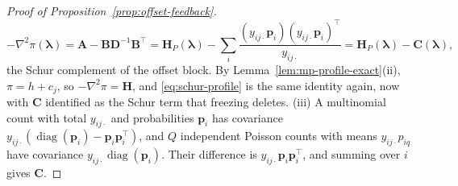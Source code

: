 \begin{proof}[Proof of Proposition~\ref{prop:offset-feedback}]
\begin{equation}
    -\nabla^{2}\pi(\bm{\lambda})=\mathbf{A}-\mathbf{B}\mathbf{D}^{-1}\mathbf{B}^{\top}=\mathbf{H}_{P}(\bm{\lambda})-\sum_{i}\frac{(y_{ij\cdot}\bm{p}_{i})(y_{ij\cdot}\bm{p}_{i})^{\top}}{y_{ij\cdot}}=\mathbf{H}_{P}(\bm{\lambda})-\mathbf{C}(\bm{\lambda}),
    \label{eq:schur-profile}
\end{equation}
the Schur complement of the offset block. By Lemma~\ref{lem:mp-profile-exact}(ii), $\pi=h+c_{j}$, so $-\nabla^{2}\pi=\mathbf{H}$, and \eqref{eq:schur-profile} is the same identity again, now with $\mathbf{C}$ identified as the Schur term that freezing deletes. (iii) A multinomial count with total $y_{ij\cdot}$ and probabilities $\bm{p}_{i}$ has covariance $y_{ij\cdot}(\operatorname{diag}(\bm{p}_{i})-\bm{p}_{i}\bm{p}_{i}^{\top})$, and $Q$ independent Poisson counts with means $y_{ij\cdot}p_{iq}$ have covariance $y_{ij\cdot}\operatorname{diag}(\bm{p}_{i})$. Their difference is $y_{ij\cdot}\bm{p}_{i}\bm{p}_{i}^{\top}$, and summing over $i$ gives $\mathbf{C}$.
\end{proof}

